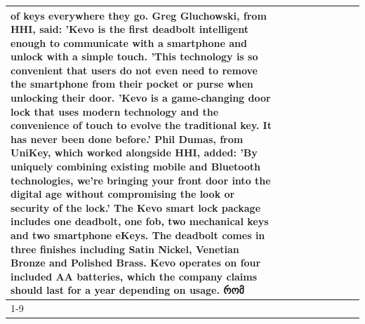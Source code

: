 \begin{table}[H]
\begin{tabular}{lllrlllll}
of keys everywhere they go. Greg Gluchowski, from HHI, said: 'Kevo is the first deadbolt intelligent enough to communicate with a smartphone and unlock with a simple touch. 'This technology is so convenient that users do not even need to remove the smartphone from their pocket or purse when unlocking their door. 'Kevo is a game-changing door lock that uses modern technology and the convenience of touch to evolve the traditional key. It has never been done before.' Phil Dumas, from UniKey, which worked alongside HHI, added: 'By uniquely combining existing mobile and Bluetooth technologies, we’re bringing your front door into the digital age without compromising the look or security of the lock.' The Kevo smart lock package includes one deadbolt, one fob, two mechanical keys and two smartphone eKeys. The deadbolt comes in three finishes including Satin Nickel, Venetian Bronze and Polished Brass. Kevo operates on four included AA batteries, which the company claims should last for a year depending on usage. რომ \\
\cline{1-9}

\end{tabular}
\end{table}

